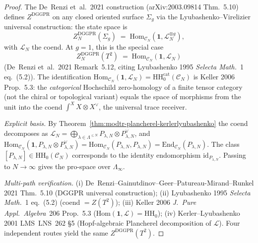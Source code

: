 \begin{proof}
The De~Renzi et~al.\ 2021 construction
(arXiv:2003.09814 Thm.~5.10) defines
$Z^{\mathrm{DGGPR}}$ on any closed oriented surface $\Sigma_g$ via
the Lyubashenko--Virelizier universal construction: the state space is
\[
 Z^{\mathrm{DGGPR}}_N(\Sigma_g)
 \;=\;
 \mathrm{Hom}_{\mathcal C_N}(\mathbf 1, \mathcal L_N^{\otimes g}),
\]
with \(\mathcal L_N\) the coend. At $g = 1$, this is the special case
\[
 Z^{\mathrm{DGGPR}}_N(T^2)
 \;=\;
 \mathrm{Hom}_{\mathcal C_N}(\mathbf 1, \mathcal L_N)
\]
(De~Renzi et~al.\ 2021 Remark~5.12, citing Lyubashenko 1995 \emph{Selecta
Math.}~1 eq.~(5.2)). The identification
$\mathrm{Hom}_{\mathcal C_N}(\mathbf 1, \mathcal L_N)
= \mathrm{HH}_0^{\mathrm{cat}}(\mathcal C_N)$ is Keller 2006 Prop.~5.3:
the \emph{categorical} Hochschild zero-homology of a finite tensor
category (not the chiral or topological variant) equals the space of
morphisms from the unit into the coend $\int^X X\otimes X^\vee$, the
universal trace receiver.

\emph{Explicit basis.} By
Theorem~\ref{thm:modtr-plancherel-kerlerlyubashenko} the coend
decomposes as
\(\mathcal L_N = \bigoplus_{\lambda\in\Lambda^{\leq N}}P_{\lambda,N}\otimes
P_{\lambda,N}^\vee\), and
\(\mathrm{Hom}_{\mathcal C_N}(\mathbf 1, P_{\lambda,N}\otimes
P_{\lambda,N}^\vee)
= \mathrm{Hom}_{\mathcal C_N}(P_{\lambda,N}, P_{\lambda,N})
=\mathrm{End}_{\mathcal C_N}(P_{\lambda,N})\). The class
\([P_{\lambda,N}]\in\mathrm{HH}_0(\mathcal C_N)\) corresponds to the
identity endomorphism \(\mathrm{id}_{P_{\lambda,N}}\). Passing to
\(N\to\infty\) gives the pro-space over \(\Lambda_\infty\).

\emph{Multi-path verification.}
(i) De~Renzi--Gainutdinov--Geer--Patureau-Mirand--Runkel 2021
Thm.~5.10 (DGGPR universal construction);
(ii) Lyubashenko 1995 \emph{Selecta Math.}~1 eq.~(5.2) (coend
$= Z(T^2)$);
(iii) Keller 2006 \emph{J.~Pure Appl.~Algebra}~206 Prop.~5.3
($\mathrm{Hom}(\mathbf 1, \mathcal L) = \mathrm{HH}_0$);
(iv) Kerler--Lyubashenko 2001 LMS~LNS~262 \S5 (Hopf-algebraic
Plancherel decomposition of $\mathcal L$).
Four independent routes yield the same $Z^{\mathrm{DGGPR}}(T^2)$.
\end{proof}

